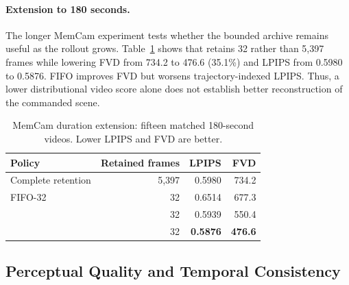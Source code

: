 \paragraph{Extension to 180 seconds.}
The longer MemCam experiment tests whether the bounded archive remains useful
as the rollout grows. Table~\ref{tab:exp-quality-180} shows that 
retains 32 rather than 5,397 frames while lowering FVD from 734.2 to 476.6
(35.1\%) and LPIPS from 0.5980 to 0.5876. FIFO improves FVD but worsens
trajectory-indexed LPIPS. Thus, a lower distributional video score alone does
not establish better reconstruction of the commanded scene.

\begin{table}[t]
\centering
\small
\caption{MemCam duration extension: fifteen matched 180-second videos.
Lower LPIPS and FVD are better.}
\label{tab:exp-quality-180}
\begin{tabular}{lrrr}
\toprule
Policy & Retained frames & LPIPS & FVD \\
\midrule
Complete retention & 5,397 & 0.5980 & 734.2 \\
FIFO-32 & 32 & 0.6514 & 677.3 \\
\RI-32 & 32 & 0.5939 & 550.4 \\
\Geo-32 & 32 & \textbf{0.5876} & \textbf{476.6} \\
\bottomrule
\end{tabular}
\end{table}

\subsection{Perceptual Quality and Temporal Consistency}
\label{sec:exp-vbench}

